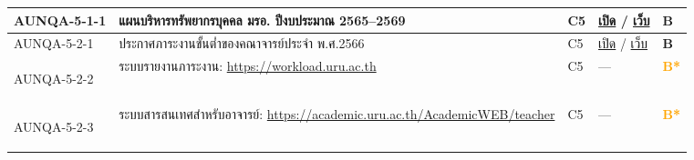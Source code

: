 \begin{longtable}{|>{\raggedright\arraybackslash}p{2.3cm}|>{\raggedright\arraybackslash}p{6.5cm}|>{\centering\arraybackslash}p{1.1cm}|>{\raggedright\arraybackslash}p{3.4cm}|>{\centering\arraybackslash}p{0.8cm}|}
  \hline
  \hypertarget{ref:AUNQA-5-1-1}{AUNQA-5-1-1} & แผนบริหารทรัพยากรบุคคล มรอ. ปีงบประมาณ 2565--2569 & C5 & \href{https://syweb.kidcbc.work/Eviden_aunqa68/\%E0\%B8\%A3\%E0\%B8\%B0\%E0\%B9\%80\%E0\%B8\%9A\%E0\%B8\%B5\%E0\%B8\%A2\%E0\%B8\%9A\%E0\%B8\%82\%E0\%B9\%89\%E0\%B8\%AD\%E0\%B8\%9A\%E0\%B8\%B1\%E0\%B8\%87\%E0\%B8\%84\%E0\%B8\%B1\%E0\%B8\%9A\%E0\%B9\%81\%E0\%B8\%A5\%E0\%B8\%B0\%E0\%B8\%9B\%E0\%B8\%A3\%E0\%B8\%B0\%E0\%B8\%81\%E0\%B8\%B2\%E0\%B8\%A8\%E0\%B8\%AD\%E0\%B8\%B7\%E0\%B9\%88\%E0\%B8\%99\%E0\%B9\%86/AUNQA-5-1-1_\%E0\%B9\%81\%E0\%B8\%9C\%E0\%B8\%99\%E0\%B8\%9A\%E0\%B8\%A3\%E0\%B8\%B4\%E0\%B8\%AB\%E0\%B8\%B2\%E0\%B8\%A3\%E0\%B8\%97\%E0\%B8\%A3\%E0\%B8\%B1\%E0\%B8\%9E\%E0\%B8\%A2\%E0\%B8\%B2\%E0\%B8\%81\%E0\%B8\%A3\%E0\%B8\%9A\%E0\%B8\%B8\%E0\%B8\%84\%E0\%B8\%84\%E0\%B8\%A5_2565-2569.pdf}{เปิด} / \href{https://personnel.uru.ac.th/wp-content/uploads/2022/03/plan_manage_2565-2569.pdf}{เว็บ} & \textcolor{blue!70!black}{\textbf{B}} \\
  \hline
  \hypertarget{ref:AUNQA-5-2-1}{AUNQA-5-2-1} & ประกาศภาระงานขั้นต่ำของคณาจารย์ประจำ พ.ศ.2566 & C5 & \href{https://syweb.kidcbc.work/Eviden_aunqa68/\%E0\%B8\%A3\%E0\%B8\%B0\%E0\%B9\%80\%E0\%B8\%9A\%E0\%B8\%B5\%E0\%B8\%A2\%E0\%B8\%9A\%E0\%B8\%82\%E0\%B9\%89\%E0\%B8\%AD\%E0\%B8\%9A\%E0\%B8\%B1\%E0\%B8\%87\%E0\%B8\%84\%E0\%B8\%B1\%E0\%B8\%9A\%E0\%B9\%81\%E0\%B8\%A5\%E0\%B8\%B0\%E0\%B8\%9B\%E0\%B8\%A3\%E0\%B8\%B0\%E0\%B8\%81\%E0\%B8\%B2\%E0\%B8\%A8\%E0\%B8\%AD\%E0\%B8\%B7\%E0\%B9\%88\%E0\%B8\%99\%E0\%B9\%86/AUNQA-5-2-1_\%E0\%B8\%9B\%E0\%B8\%A3\%E0\%B8\%B0\%E0\%B8\%81\%E0\%B8\%B2\%E0\%B8\%A8\%E0\%B8\%A0\%E0\%B8\%B2\%E0\%B8\%A3\%E0\%B8\%B0\%E0\%B8\%87\%E0\%B8\%B2\%E0\%B8\%99\%E0\%B8\%82\%E0\%B8\%B1\%E0\%B9\%89\%E0\%B8\%99\%E0\%B8\%95\%E0\%B9\%88\%E0\%B8\%B3_2566.pdf}{เปิด} / \href{https://academic.uru.ac.th/document/06912.pdf}{เว็บ} & \textcolor{blue!70!black}{\textbf{B}} \\
  \hline
  \hypertarget{ref:AUNQA-5-2-2}{AUNQA-5-2-2} & ระบบรายงานภาระงาน: \url{https://workload.uru.ac.th} & C5 & — & \textcolor{orange}{\textbf{B*}} \\
  \hline
  \hypertarget{ref:AUNQA-5-2-3}{AUNQA-5-2-3} & ระบบสารสนเทศสำหรับอาจารย์: \url{https://academic.uru.ac.th/AcademicWEB/teacher} & C5 & — & \textcolor{orange}{\textbf{B*}} \\
  \hline

\end{longtable}

